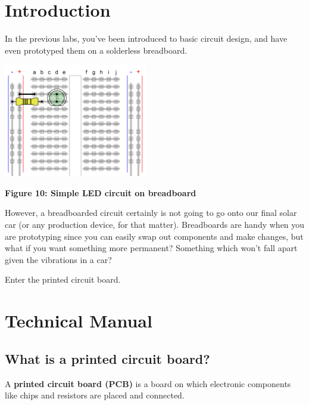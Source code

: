 \documentclass[letterpaper]{article}
\begin{document}
\clearpage
\bigskip

\section{Introduction}
{\sffamily\color[rgb]{0.30980393,0.5058824,0.7411765}
In the previous labs, you've been introduced to basic circuit design, and have even prototyped them on a solderless
breadboard.}

 \includegraphics[width=2.4693in,height=1.9465in]{figures/ee4document-img002.png} 

{\sffamily\bfseries\color[rgb]{0.30980393,0.5058824,0.7411765}
Figure 10: Simple LED circuit on breadboard}

{\sffamily\color[rgb]{0.30980393,0.5058824,0.7411765}
However, a breadboarded circuit certainly is not going to go onto our final solar car (or any production device, for
that matter). Breadboards are handy when you are prototyping since you can easily swap out components and make changes,
but what if you want something more permanent? Something which won't fall apart given the vibrations in a car?}

{\sffamily\color[rgb]{0.30980393,0.5058824,0.7411765}
Enter the printed circuit board.}

\section{Technical Manual}
\hypertarget{Toc337742672}{}\subsection{What is a printed circuit board?}
\hypertarget{Toc337742673}{}{\sffamily\color[rgb]{0.30980393,0.5058824,0.7411765}
A \textbf{printed circuit board (PCB)} is a board on which electronic components like chips and resistors are placed and
connected.}
\end{document}
